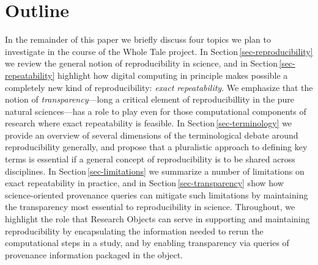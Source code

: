 \section{Outline}
In the remainder of this paper 
we briefly discuss four topics we plan to investigate
	in the course of the Whole Tale project.
In Section\,\ref{sec-reproducibility} we review the general notion of
reproducibility in science, and in Section\,\ref{sec-repeatability} 
	highlight how digital computing in principle makes possible a completely new kind of reproducibility: 
	\emph{exact repeatability}. 
We emphasize that the notion of \emph{transparency}---long a critical element of
	reproducibillity in the pure natural sciences---has a role to play even for those computational components
	of research where exact repeatability is feasible.
In Section\,\ref{sec-terminology} we provide an overview of several dimensions of the terminological debate around reproducibility
	generally, and propose that a pluralistic approach to defining key terms is essential if a general 
	concept of reproducibility is to be shared across disciplines.
In Section\,\ref{sec-limitations} we summarize a number of limitations on exact repeatability in practice, and in Section\,\ref{sec-transparency}
	show how science-oriented provenance queries can mitigate such limitations by maintaining
 	the transparency most essential to reproducibility in science.
Throughout, we highlight the role that Research Objects
\cite{bechhofer2013whya} can serve in supporting and maintaining 
	reproducibility by encapsulating the information needed to rerun the computational steps
	in a study, and by enabling transparency via queries of provenance information
	packaged in the object. 
 

